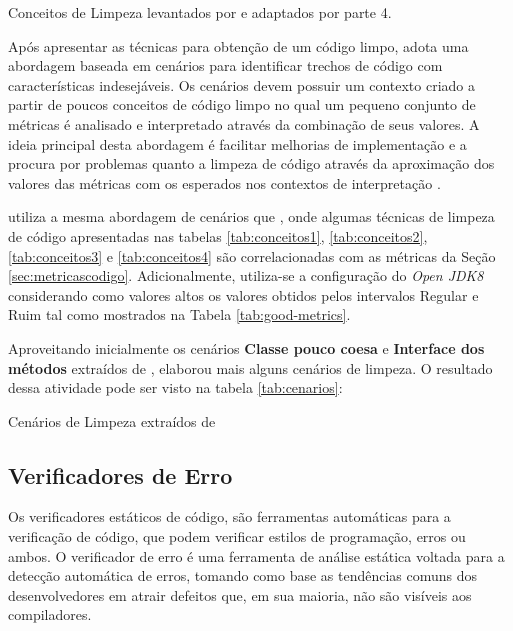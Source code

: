 \begin{table}[!ht]
\centering

\caption{Conceitos de Limpeza levantados por  e adaptados por  parte 4.} 
\label{tab:conceitos4}
\end{table}
\FloatBarrier

Após apresentar as técnicas para obtenção de um código limpo,    adota uma abordagem baseada em cenários para identificar trechos de código com características indesejáveis. Os cenários devem possuir um contexto criado a partir de poucos conceitos de código limpo no qual um pequeno conjunto de métricas é analisado e interpretado através da combinação de seus valores. A ideia principal desta abordagem é facilitar melhorias de implementação e a procura por problemas quanto a limpeza de código através da aproximação dos valores das métricas com os esperados nos contextos de interpretação \cite{Machini2010}.

 utiliza a mesma abordagem de cenários que , onde algumas técnicas de limpeza de código apresentadas nas tabelas \ref{tab:conceitos1}, \ref{tab:conceitos2}, \ref{tab:conceitos3} e \ref{tab:conceitos4} são correlacionadas com as métricas da Seção \ref{sec:metricascodigo}. Adicionalmente, utiliza-se a configuração do \textit{ Open JDK8 } considerando como valores altos os valores obtidos pelos intervalos Regular e Ruim tal como mostrados na Tabela \ref{tab:good-metrics}.

Aproveitando inicialmente os cenários \textbf{Classe pouco coesa} e \textbf{Interface dos métodos} extraídos de  ,  elaborou mais alguns cenários de limpeza. O resultado dessa atividade pode ser visto na tabela \ref{tab:cenarios}:

\begin{table}
\begin{table}[H]
\centering

\caption{Cenários de Limpeza extraídos de }
\label{tab:cenarios}
\end{table}
\FloatBarrier

\end{table} 

\subsection{Verificadores de Erro}
\label{chap:verificadores}
Os verificadores estáticos de código, são ferramentas automáticas para a verificação de código, que podem verificar estilos de programação, erros ou ambos. O verificador de erro é uma ferramenta de análise estática voltada para a detecção automática de erros, tomando como base as tendências comuns dos desenvolvedores em atrair defeitos que, em sua maioria, não são visíveis aos compiladores. \cite{Louridas2006}

